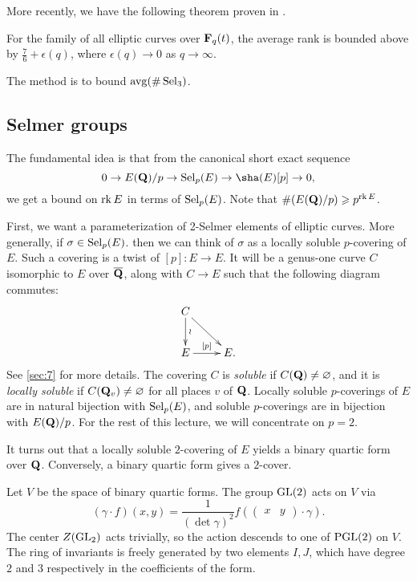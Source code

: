 More recently, we have the following theorem proven in \cite{j02}. 

\begin{theo}[de Jong]
For the family of all elliptic curves over $\mathbf{F}_q(t)$, the average rank is 
bounded above by $\frac 7 6+\epsilon(q)$, where $\epsilon(q)\to 0$ as 
$q\to \infty$. 
\end{theo}

The method is to bound $\operatorname{avg}(\# \operatorname{Sel}_3)$. 





\subsection{Selmer groups}

The fundamental idea is that from the canonical short exact sequence 
\[
  0 \to E(\dQ)/p \to \selmer_p(E) \to \sha(E)[p] \to 0 ,
\]
we get a bound on $\operatorname{rk} E$ in terms of $\operatorname{Sel}_p(E)$. Note that 
$\#(E(\mathbf{Q})/p) \geqslant p^{\operatorname{rk} E}$. 

First, we want a parameterization of 2-Selmer elements of elliptic curves. 
More generally, if $\sigma\in \operatorname{Sel}_p(E)$. then we can think of $\sigma$ as a 
locally soluble $p$-covering of $E$. Such a covering is a twist of 
$[p]:E\to E$. It will be a genus-one curve $C$ isomorphic to $E$ over 
$\overline{\mathbf{Q}}$, along with $C\to E$ such that the following diagram commutes:
\[\xymatrix{
  C \ar[d]^-\wr \ar[dr] \\
  E \ar[r]^-{[p]} 
    & E .
}\]
See \autoref{sec:7} for more details. The covering $C$ is \emph{soluble} if 
$C(\mathbf{Q})\ne \varnothing$, and it is \emph{locally soluble} if 
$C(\mathbf{Q}_v)\ne\varnothing$ for all places $v$ of $\mathbf{Q}$. Locally soluble 
$p$-coverings of $E$ are in natural bijection with $\operatorname{Sel}_p(E)$, and 
soluble $p$-coverings are in bijection with $E(\mathbf{Q})/p$. For the rest of this 
lecture, we will concentrate on $p=2$. 

It turns out that a locally soluble $2$-covering of $E$ yields a binary quartic 
form over $\mathbf{Q}$. Conversely, a binary quartic form gives a $2$-cover. 

Let $V$ be the space of binary quartic forms. The group $\operatorname{GL}(2)$ 
acts on $V$ via 
\[
  (\gamma\cdot f)(x,y) = \frac{1}{(\det\gamma)^2}f\left(\begin{pmatrix} x & y \end{pmatrix} \cdot \gamma\right) .
\]
The center $Z(\operatorname{GL}_2)$ acts trivially, so the action descends to 
one of $\operatorname{PGL}(2)$ on $V$. The ring of invariants is 
freely generated by two elements $I,J$, which have degree $2$ and $3$ 
respectively in the coefficients of the form. 

